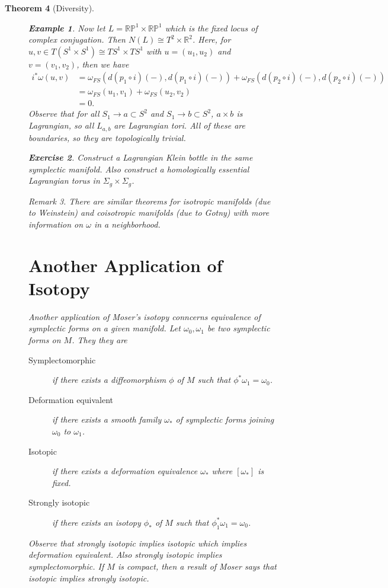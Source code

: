 \documentclass[leqno, openany]{memoir}
\newtheorem{thm}{Theorem}[chapter]
\theoremstyle{definition}
\newtheorem{exm}[thm]{Example}
\newtheorem{exer}[thm]{Exercise}
\theoremstyle{remark}
\newtheorem{rmk}[thm]{Remark}
\theoremstyle{plain}
\theoremstyle{definition}
\theoremstyle{remark}
\newcommand{\R}{\mathbb{R}}
\renewcommand{\P}{\mathbb{P}}
\begin{document}
\begin{thm}[Diversity]
\begin{figure}[H]
\begin{exm}
        Now let $L = \R\P^1 \times \R\P^1$ which is the fixed locus of complex
        conjugation. Then $N(L) \cong T^2 \times \R^2$. Here, for $u,v \in
        T(S^1 \times S^1) \cong TS^1 \times TS^1$ with $u = (u_1, u_2)$ and $v
        = (v_1, v_2)$, then we have \begin{align*} i^* \omega(u,v) &=
        \omega_{FS}(d(p_1 \circ i)(-), d(p_1 \circ i)(-)) + \omega_{FS}(d(p_2
    \circ i)(-), d(p_2 \circ i)(-)) \\ &= \omega_{FS}(u_1, v_1) +
\omega_{FS}(u_2, v_2) \\ &= 0.  \end{align*} Observe that for all $S_1 \to a
\subset S^2$ and $S_1 \to b \subset S^2$, $a \times b$ is Lagrangian, so all
$L_{a,b}$ are Lagrangian tori. All of these are boundaries, so they are
topologically trivial.  \end{exm}

    \begin{exer} Construct a Lagrangian Klein bottle in the same symplectic
    manifold. Also construct a homologically \textit{essential} Lagrangian
torus in $\Sigma_g \times \Sigma_g$.  \end{exer}

    \begin{rmk} There are similar theorems for isotropic manifolds (due to
    Weinstein) and coisotropic manifolds (due to Gotny) with more information
on $\omega$ in a neighborhood.  \end{rmk}

    \section{Another Application of Isotopy}%
    \label{sec:another_application_of_isotopy}

    Another application of Moser's isotopy conncerns equivalence of symplectic
    forms on a given manifold. Let $\omega_0, \omega_1$ be two symplectic forms
    on $M$. They they are \begin{description} \item[Symplectomorphic] if there
        exists a diffeomorphism $\phi$ of $M$ such that $\phi^* \omega_1 =
        \omega_0$.  \item[Deformation equivalent] if there exists a smooth
        family $\omega_*$ of symplectic forms joining $\omega_0$ to $\omega_1$.
    \item[Isotopic] if there exists a deformation equivalence $\omega_*$ where
        $[\omega_*]$ is fixed.  \item[Strongly isotopic] if there exists an
isotopy $\phi_*$ of $M$ such that $\phi_1^* \omega_1 = \omega_0$.
\end{description} Observe that strongly isotopic implies isotopic which implies
deformation equivalent. Also strongly isotopic implies symplectomorphic. If $M$
is compact, then a result of Moser says that isotopic implies strongly
isotopic.


\end{figure}
\end{thm}
\end{document}
